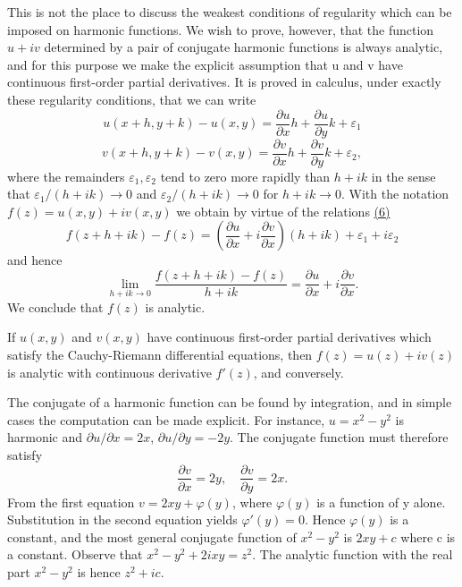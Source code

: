 This is not the place to discuss the weakest conditions of regularity which can be imposed on harmonic functions. We wish to prove, however, that the function $u + iv$ determined by a pair of conjugate harmonic functions is always analytic, and for this purpose we make the explicit assumption that u and v have continuous first-order partial derivatives. It is proved in calculus, under exactly these regularity conditions, that we can write
\begin{equation*}
u (x + h, y + k) - u (x, y) = \frac {\partial u}{\partial x} h + \frac {\partial u}{\partial y} k + \varepsilon_ {1}
\end{equation*}
\begin{equation*}
v (x + h, y + k) - v (x, y) = \frac {\partial v}{\partial x} h + \frac {\partial v}{\partial y} k + \varepsilon_ {2},
\end{equation*}
where the remainders $\varepsilon_{1}, \varepsilon_{2}$ tend to zero more rapidly than $h + ik$ in the sense that $\varepsilon_{1}/(h + ik) \to 0$ and $\varepsilon_{2}/(h + ik) \to 0$ for $h + ik \to 0$. With the notation $f(z) = u(x,y) + iv(x,y)$ we obtain by virtue of the relations \hyperref[eq:2.6]{(6)}
\begin{equation*}
f (z + h + i k) - f (z) = \left(\frac {\partial u}{\partial x} + i \frac {\partial v}{\partial x}\right) (h + i k) + \varepsilon_ {1} + i \varepsilon_ {2}
\end{equation*}
and hence
\begin{equation*}
\lim _ {h + i k \rightarrow 0} \frac {f (z + h + i k) - f (z)}{h + i k} = \frac {\partial u}{\partial x} + i \frac {\partial v}{\partial x}.
\end{equation*}
We conclude that $f(z)$ is analytic.

If $u(x,y)$ and $v(x,y)$ have continuous first-order partial derivatives which satisfy the Cauchy-Riemann differential equations, then $f(z) = u(z) + iv(z)$ is analytic with continuous derivative $f'(z)$, and conversely.

The conjugate of a harmonic function can be found by integration, and in simple cases the computation can be made explicit. For instance, $u = x^{2} - y^{2}$ is harmonic and $\partial u/\partial x = 2x$, $\partial u/\partial y = -2y$. The conjugate function must therefore satisfy
\begin{equation*}
\frac {\partial v}{\partial x} = 2 y, \quad \frac {\partial v}{\partial y} = 2 x.
\end{equation*}
From the first equation $v = 2xy + \varphi(y)$, where $\varphi(y)$ is a function of y alone. Substitution in the second equation yields $\varphi'(y) = 0$. Hence $\varphi(y)$ is a constant, and the most general conjugate function of $x^{2} - y^{2}$ is $2xy + c$ where c is a constant. Observe that $x^{2} - y^{2} + 2ixy = z^{2}$. The analytic function with the real part $x^{2} - y^{2}$ is hence $z^{2} + ic$.



